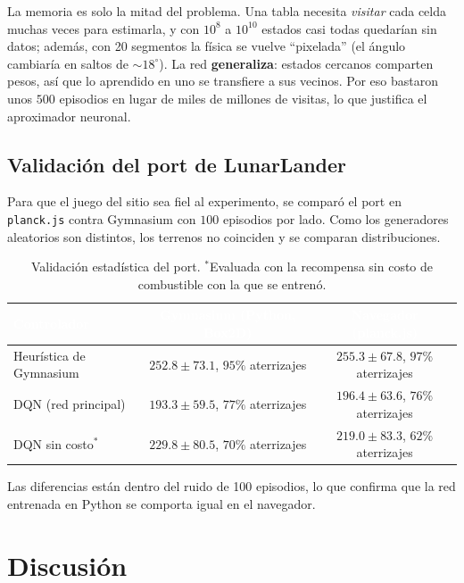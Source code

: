 \documentclass[11pt]{article}
\begin{document}
La memoria es solo la mitad del problema. Una tabla necesita \emph{visitar} cada
celda muchas veces para estimarla, y con $10^8$ a $10^{10}$ estados casi todas
quedarían sin datos; además, con 20 segmentos la física se vuelve ``pixelada''
(el ángulo cambiaría en saltos de $\sim 18^\circ$). La red \textbf{generaliza}:
estados cercanos comparten pesos, así que lo aprendido en uno se transfiere a sus
vecinos. Por eso bastaron unos $500$ episodios en lugar de miles de millones de
visitas, lo que justifica el aproximador neuronal.

\subsection{Validación del port de LunarLander}

Para que el juego del sitio sea fiel al experimento, se comparó el port en
\texttt{planck.js} contra Gymnasium con $100$ episodios por lado. Como los
generadores aleatorios son distintos, los terrenos no coinciden y se comparan
distribuciones.

\begin{table}[H]
\centering
\renewcommand{\arraystretch}{1.2}
\begin{tabular}{|l|c|c|}
\hline
\rowcolor{iberoblue}
\textcolor{white}{Controlador} & \textcolor{white}{Gymnasium (Python, Box2D)} &
\textcolor{white}{Navegador (planck.js)} \\ \hline
Heurística de Gymnasium   & $252.8 \pm 73.1$, $95\%$ aterrizajes & $255.3 \pm 67.8$, $97\%$ aterrizajes \\ \hline
DQN (red principal)       & $193.3 \pm 59.5$, $77\%$ aterrizajes & $196.4 \pm 63.6$, $76\%$ aterrizajes \\ \hline
DQN sin costo$^{*}$       & $229.8 \pm 80.5$, $70\%$ aterrizajes & $219.0 \pm 83.3$, $62\%$ aterrizajes \\ \hline
\end{tabular}
\caption{Validación estadística del port. $^{*}$Evaluada con la recompensa sin
costo de combustible con la que se entrenó.}
\label{tbl:validacion}
\end{table}

Las diferencias están dentro del ruido de 100 episodios, lo que confirma que la
red entrenada en Python se comporta igual en el navegador.

\section{Discusión}
\label{sec:discusion}
\end{document}

